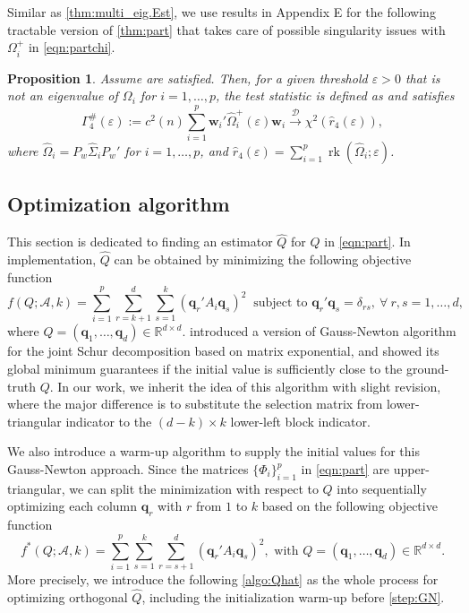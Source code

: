 \documentclass[12pt]{article}
\numberwithin{thm}{section}
\numberwithin{defn}{section}
\numberwithin{lem}{section}
\newtheorem{prop}{Proposition}
\numberwithin{prop}{section}
\numberwithin{cor}{section}
\numberwithin{rem}{section}
\newcommand{\rank}{\operatorname{rk}}
\begin{document}
Similar as \autoref{thm:multi_eig.Est}, we use results in {\color{cyan} Appendix E} for the following tractable version of \autoref{thm:part} that takes care of possible singularity issues with $\Omega_i^+$ in \eqref{eqn:partchi}.

\begin{prop}\label{thm:part.Est}
Assume  are satisfied. Then, for a given threshold $\varepsilon > 0$ that is not an eigenvalue of $\Omega_i$ for $i = 1, \dots, p$, 
the test statistic is defined as and satisfies
\begin{equation}\label{eq:gamma4.est}
    \Gamma_4^\#(\varepsilon) := c^2(n) \sum_{i = 1}^p \bm{w}_i' \widehat{\Omega}_i^+(\varepsilon) \bm{w}_i \xrightarrow{\mathcal{D}} \chi^2(\widehat{r}_4(\varepsilon)),
\end{equation}
where $\widehat{\Omega}_i = P_w \widehat{\Sigma}_i P_w'$ for $i = 1, \dots, p$, and $\widehat{r}_4(\varepsilon) = \sum_{i=1}^p \rank(\widehat{\Omega}_i; \varepsilon)$.%
\end{prop}

\vspace{-0.5cm}
\subsection{Optimization algorithm} \label{sec:partalg}
\vspace{-0.3cm}
This section is dedicated to finding an estimator $\widehat{Q}$ for $Q$ in \eqref{eqn:part}.
In implementation, $\widehat{Q}$ can be obtained by minimizing the following objective function
$$
f(Q; \mathcal{A}, k) = \sum_{i = 1}^p \sum_{r = k+1}^d \sum_{s = 1}^k (\bm{q}_r' A_i \bm{q}_s)^2 ~ \mbox{ subject to } \bm{q}_r' \bm{q}_s = \delta_{rs}, ~ \forall~ r,s = 1, \dots, d,
$$
where $Q = (\bm{q}_1, \dots, \bm{q}_d) \in \mathbb{R}^{d \times d}$.
\cite{tensor} introduced a version of Gauss-Newton algorithm for the joint Schur decomposition based on matrix exponential, and showed its global minimum guarantees if the initial value is sufficiently close to the ground-truth $Q$. In our work, we inherit the idea of this algorithm with slight revision, where the major difference is to substitute the selection matrix from lower-triangular indicator to the $(d-k) \times k$ lower-left block indicator.

We also introduce a warm-up algorithm to supply the initial values for this Gauss-Newton approach. Since the matrices $\{\Phi_i\}_{i = 1}^p$ in \eqref{eqn:part} are upper-triangular, we can split the minimization with respect to $Q$ into sequentially optimizing each column $\bm{q}_r$ with $r$ from $1$ to $k$ based on the following objective function
$$
f^*(Q; \mathcal{A}, k) = \sum_{i = 1}^p \sum_{s = 1}^k \sum_{r = s+1}^d (\bm{q}_r' A_i \bm{q}_s)^2, \mbox{ with } Q = (\bm{q}_1, \dots, \bm{q}_d) \in \mathbb{R}^{d \times d}.
$$
More precisely, we introduce the following \autoref{algo:Qhat} as the whole process for optimizing orthogonal $\widehat{Q}$, including the initialization warm-up before \autoref{step:GN}.
\end{document}
